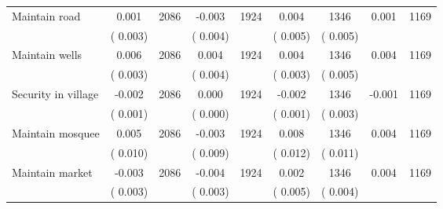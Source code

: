 \begin{tabular}{l*{8}{c}}
Maintain road        &              0.001      &       2086       &             -0.003      &       1924       &              0.004      &       1346  &        0.001 &       1169       \\
                       &       (       0.003)            &                               &       (       0.004)            &                               &       (       0.005)            &       (       0.005) &                  \\
Maintain wells        &              0.006      &       2086       &              0.004      &       1924       &              0.004      &       1346  &        0.004 &       1169       \\
                       &       (       0.003)            &                               &       (       0.004)            &                               &       (       0.003)            &       (       0.005) &                  \\
Security in village        &             -0.002      &       2086       &              0.000      &       1924       &             -0.002      &       1346  &       -0.001 &       1169       \\
                       &       (       0.001)            &                               &       (       0.000)            &                               &       (       0.001)            &       (       0.003) &                  \\
Maintain mosquee        &              0.005      &       2086       &             -0.003      &       1924       &              0.008      &       1346  &        0.004 &       1169       \\
                       &       (       0.010)            &                               &       (       0.009)            &                               &       (       0.012)            &       (       0.011) &                  \\
Maintain market        &             -0.003      &       2086       &             -0.004      &       1924       &              0.002      &       1346  &        0.004 &       1169       \\
                       &       (       0.003)            &                               &       (       0.003)            &                               &       (       0.005)            &       (       0.004) &                  \\
\hline \end{tabular}